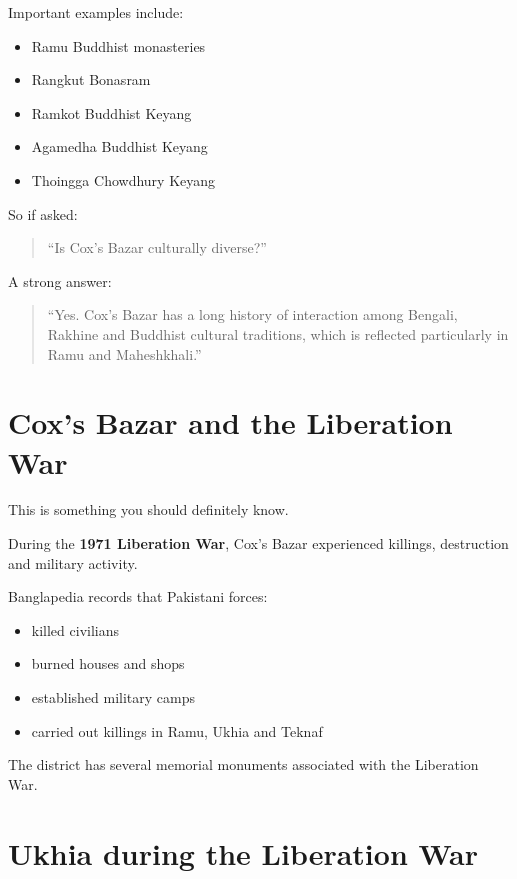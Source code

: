 Important examples include:

\begin{itemize}
  \item Ramu Buddhist monasteries
  \item Rangkut Bonasram
  \item Ramkot Buddhist Keyang
  \item Agamedha Buddhist Keyang
  \item Thoingga Chowdhury Keyang
\end{itemize}



So if asked:

\begin{quote}
``Is Cox's Bazar culturally diverse?''\\
\end{quote}

A strong answer:

\begin{quote}
``Yes. Cox's Bazar has a long history of interaction among Bengali, Rakhine and Buddhist cultural traditions, which is reflected particularly in Ramu and Maheshkhali.''\\
\end{quote}

\medskip

\section{Cox's Bazar and the Liberation War}

This is something you should definitely know.

During the \textbf{1971 Liberation War}, Cox's Bazar experienced killings, destruction and military activity.

Banglapedia records that Pakistani forces:

\begin{itemize}
  \item killed civilians
  \item burned houses and shops
  \item established military camps
  \item carried out killings in Ramu, Ukhia and Teknaf
\end{itemize}

The district has several memorial monuments associated with the Liberation War.

\medskip

\section{Ukhia during the Liberation War}

